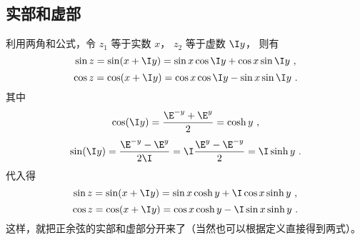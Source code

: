 \subsection{实部和虚部}
利用两角和公式，令 $z_1$ 等于实数 $x$，  $z_2$ 等于虚数 $\I y$， 则有
 \begin{equation}
\sin z = \sin(x + \I y) = \sin x\cos \I y + \cos x\sin \I y~,
\end{equation} 
\begin{equation}
\cos z = \cos(x + \I y) = \cos x\cos \I y - \sin x\sin \I y~.
\end{equation} 
其中
\begin{equation}\label{eq_CTrig_5}
\cos(\I y) = \frac{\E^{-y} + \E^y}{2} = \cosh y~,
\end{equation} 
\begin{equation}\label{eq_CTrig_6}
\sin(\I y) = \frac{\E^{-y} - \E^y}{2\I} = \I\frac{\E^y - \E^{-y}}{2} = \I\sinh y~.
\end{equation} 
代入得
\begin{equation}
\sin z = \sin(x + \I y) = \sin x\cosh y + \I\cos x\sinh y~,
\end{equation} 
\begin{equation}
\cos z = \cos(x + \I y) = \cos x\cosh y - \I\sin x\sinh y~.
\end{equation}  
这样，就把正余弦的实部和虚部分开来了（当然也可以根据定义直接得到两式）。























